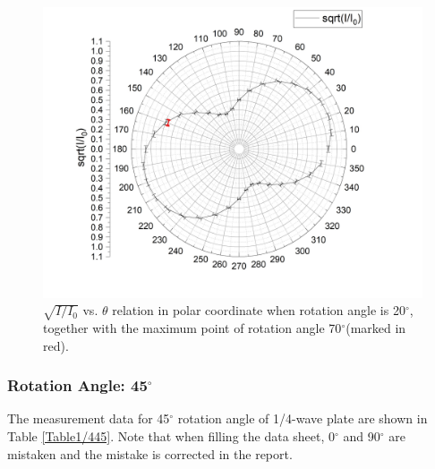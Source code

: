 \documentclass{article}
\begin{document}
\begin{figure}[H]\centering
\includegraphics[scale=0.12]{4.jpg}
\caption{$\sqrt{I/I_0}$ vs. $\theta$ relation in polar coordinate when rotation angle is 20$^\circ$, together with the maximum point of rotation angle 70$^\circ$(marked in red).}\label{Fig20}
\end{figure}


\subsubsection{Rotation Angle: 45$^\circ$}

The measurement data for 45$^\circ$ rotation angle of 1/4-wave plate are shown in Table \ref{Table1/445}.  Note that when filling the data sheet, 0$^\circ$ and 90$^\circ$ are mistaken and the mistake is corrected in the report.
\end{document}
